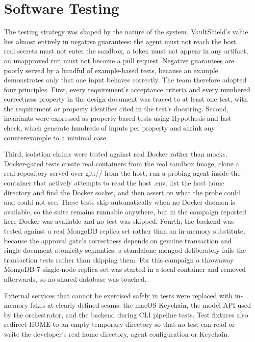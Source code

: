 \documentclass[12pt,a4paper,oneside]{report}
\begin{document}
\section{Software Testing}\label{software-testing-1}

The testing strategy was shaped by the nature of the system. VaultShield's value lies almost entirely in negative guarantees: the agent must not reach the host, real secrets must not enter the sandbox, a token must not appear in any artifact, an unapproved run must not become a pull request. Negative guarantees are poorly served by a handful of example-based tests, because an example demonstrates only that one input behaves correctly. The team therefore adopted four principles. First, every requirement's acceptance criteria and every numbered correctness property in the design document was traced to at least one test, with the requirement or property identifier cited in the test's docstring. Second, invariants were expressed as property-based tests using Hypothesis and fast-check, which generate hundreds of inputs per property and shrink any counterexample to a minimal case.

Third, isolation claims were tested against real Docker rather than mocks. Docker-gated tests create real containers from the real sandbox image, clone a real repository served over git:// from the host, run a probing agent inside the container that actively attempts to read the host .env, list the host home directory and find the Docker socket, and then assert on what the probe could and could not see. These tests skip automatically when no Docker daemon is available, so the suite remains runnable anywhere, but in the campaign reported here Docker was available and no test was skipped. Fourth, the backend was tested against a real MongoDB replica set rather than an in-memory substitute, because the approval gate's correctness depends on genuine transaction and single-document atomicity semantics; a standalone mongod deliberately fails the transaction tests rather than skipping them. For this campaign a throwaway MongoDB 7 single-node replica set was started in a local container and removed afterwards, so no shared database was touched.

External services that cannot be exercised safely in tests were replaced with in-memory fakes at clearly defined seams: the macOS Keychain, the model API used by the orchestrator, and the backend during CLI pipeline tests. Test fixtures also redirect HOME to an empty temporary directory so that no test can read or write the developer's real home directory, agent configuration or Keychain.
\end{document}
